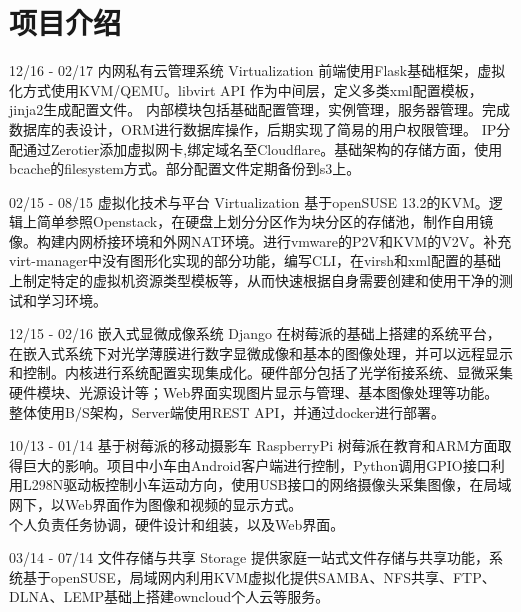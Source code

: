 \documentclass[]{friggeri-cv}
\begin{document}
\section{项目介绍}
\begin{entrylist}
  \entry
    {12/16 - 02/17}
    {内网私有云管理系统}
    {Virtualization}
    { 前端使用Flask基础框架，虚拟化方式使用KVM/QEMU。libvirt API 作为中间层，定义多类xml配置模板，jinja2生成配置文件。
内部模块包括基础配置管理，实例管理，服务器管理。完成数据库的表设计，ORM进行数据库操作，后期实现了简易的用户权限管理。
IP分配通过Zerotier添加虚拟网卡,绑定域名至Cloudflare。基础架构的存储方面，使用bcache的filesystem方式。部分配置文件定期备份到s3上。
    \\}


  \entry
    {02/15 - 08/15 }
    {虚拟化技术与平台}
    {Virtualization}
    {基于openSUSE 13.2的KVM。逻辑上简单参照Openstack，在硬盘上划分分区作为块分区的存储池，制作自用镜像。构建内网桥接环境和外网NAT环境。进行vmware的P2V和KVM的V2V。补充virt-manager中没有图形化实现的部分功能，编写CLI，在virsh和xml配置的基础上制定特定的虚拟机资源类型模板等，从而快速根据自身需要创建和使用干净的测试和学习环境。
    \\}   

  \entry
    {12/15 - 02/16}
    {嵌入式显微成像系统}
    {Django}
    {在树莓派的基础上搭建的系统平台，在嵌入式系统下对光学薄膜进行数字显微成像和基本的图像处理，并可以远程显示和控制。内核进行系统配置实现集成化。硬件部分包括了光学衔接系统、显微采集硬件模块、光源设计等；Web界面实现图片显示与管理、基本图像处理等功能。\\
    整体使用B/S架构，Server端使用REST API，并通过docker进行部署。
   \\ }%

   \entry
   {10/13 - 01/14}
   {基于树莓派的移动摄影车}
   {RaspberryPi}
   {
    树莓派在教育和ARM方面取得巨大的影响。项目中小车由Android客户端进行控制，Python调用GPIO接口利用L298N驱动板控制小车运动方向，使用USB接口的网络摄像头采集图像，在局域网下，以Web界面作为图像和视频的显示方式。\\
    个人负责任务协调，硬件设计和组装，以及Web界面。\\
   }

  \entry
    {03/14 - 07/14 }
    {文件存储与共享}
    {Storage}
    {提供家庭一站式文件存储与共享功能，系统基于openSUSE，局域网内利用KVM虚拟化提供SAMBA、NFS共享、FTP、DLNA、LEMP基础上搭建owncloud个人云等服务。\\}%
\end{entrylist}
\end{document}
